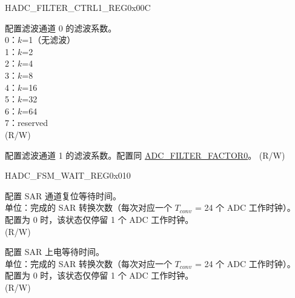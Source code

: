 \begin{register}{H}{ADC\_FILTER\_CTRL1\_REG}{0x00C}\label{regdesc:ADCFILTERCTRL1REG}
%
%
%
\regnewline%
\begin{regdesc}\begin{reglist}
\label{fielddesc:ADCFILTERFACTOR0}\item [ADC\_FILTER\_FACTOR0] 配置滤波通道 0 的滤波系数。\\
0：$k$=1（无滤波）\\
1：$k$=2\\
2：$k$=4\\
3：$k$=8\\
4：$k$=16\\
5：$k$=32\\
6：$k$=64\\
7：reserved\\
(R/W)
\label{fielddesc:ADCFILTERFACTOR1}\item [ADC\_FILTER\_FACTOR1] 配置滤波通道 1 的滤波系数。配置同 \hyperref[fielddesc:ADCFILTERFACTOR0]{ADC\_FILTER\_FACTOR0}。 (R/W)
\end{reglist}\end{regdesc}
\end{register}


\begin{register}{H}{ADC\_FSM\_WAIT\_REG}{0x010}\label{regdesc:ADCFSMWAITREG}
%
%
%
\regnewline%
\begin{regdesc}\begin{reglist}
\label{fielddesc:ADCRSTBWAIT}\item [ADC\_RSTB\_WAIT] 配置 SAR 通道复位等待时间。\\
单位：完成的 SAR 转换次数（每次对应一个 $T_{conv}$ = 24 个 ADC 工作时钟）。\\
配置为 0 时，该状态仅停留 1 个 ADC 工作时钟。\\
(R/W)
\label{fielddesc:ADCXPDWAIT}\item [ADC\_XPD\_WAIT] 配置 SAR 上电等待时间。\\
单位：完成的 SAR 转换次数（每次对应一个 $T_{conv}$ = 24 个 ADC 工作时钟）。\\
配置为 0 时，该状态仅停留 1 个 ADC 工作时钟。\\
(R/W)
\end{reglist}\end{regdesc}
\end{register}


